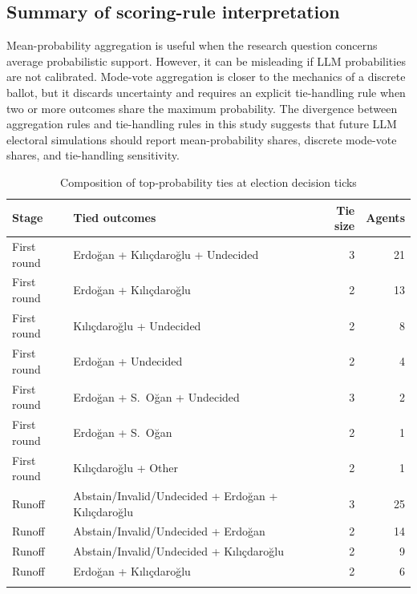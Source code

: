 \documentclass[pdflatex,sn-mathphys-num,iicol]{sn-jnl}
\begin{document}
\begin{appendices}
\renewcommand{\thetable}{\arabic{table}}
\setcounter{table}{4}%

\section{Summary of scoring-rule interpretation}\label{app:scoring}

Mean-probability aggregation is useful when the research question concerns
average probabilistic support. However, it can be misleading if LLM
probabilities are not calibrated. Mode-vote aggregation is closer to the
mechanics of a discrete ballot, but it discards uncertainty and requires an
explicit tie-handling rule when two or more outcomes share the maximum
probability. The divergence between aggregation rules and tie-handling rules in
this study suggests that future LLM electoral simulations should report
mean-probability shares, discrete mode-vote shares, and tie-handling
sensitivity.

\begin{table}[!htbp]
\caption{Composition of top-probability ties at election decision ticks}
\label{tab:ties}
\centering\footnotesize
\begin{tabular}{@{}llrr@{}}
\toprule
Stage & Tied outcomes & Tie size & Agents \\
\midrule
First round & Erdoğan + Kılıçdaroğlu + Undecided       & 3 & 21 \\
First round & Erdoğan + Kılıçdaroğlu                   & 2 & 13 \\
First round & Kılıçdaroğlu + Undecided                 & 2 &  8 \\
First round & Erdoğan + Undecided                      & 2 &  4 \\
First round & Erdoğan + S.\ Oğan + Undecided           & 3 &  2 \\
First round & Erdoğan + S.\ Oğan                       & 2 &  1 \\
First round & Kılıçdaroğlu + Other                     & 2 &  1 \\
\midrule
Runoff & Abstain/Invalid/Undecided + Erdoğan + Kılıçdaroğlu & 3 & 25 \\
Runoff & Abstain/Invalid/Undecided + Erdoğan          & 2 & 14 \\
Runoff & Abstain/Invalid/Undecided + Kılıçdaroğlu     & 2 &  9 \\
Runoff & Erdoğan + Kılıçdaroğlu                       & 2 &  6 \\
\botrule
\end{tabular}
\normalsize
\end{table}


\end{appendices}
\end{document}
